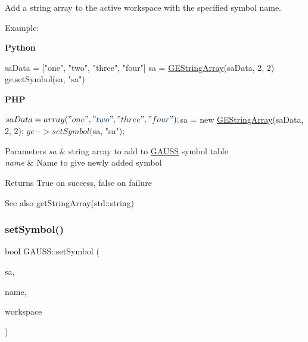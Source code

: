 Add a string array to the active workspace with the specified symbol name. 

Example\+:

{\bfseries Python} 
\begin{DoxyCode}
saData = [\textcolor{stringliteral}{"one"}, \textcolor{stringliteral}{"two"}, \textcolor{stringliteral}{"three"}, \textcolor{stringliteral}{"four"}]
sa = \hyperlink{class_g_e_string_array}{GEStringArray}(saData, 2, 2)
ge.setSymbol(sa, \textcolor{stringliteral}{"sa"})
\end{DoxyCode}


{\bfseries P\+HP} 
\begin{DoxyCode}
$saData = array(\textcolor{stringliteral}{"one"}, \textcolor{stringliteral}{"two"}, \textcolor{stringliteral}{"three"}, \textcolor{stringliteral}{"four"});
$sa = \textcolor{keyword}{new} \hyperlink{class_g_e_string_array}{GEStringArray}(saData, 2, 2);
$ge->setSymbol($sa, \textcolor{stringliteral}{"sa"});
\end{DoxyCode}



\begin{DoxyParams}{Parameters}
{\em sa} & string array to add to \hyperlink{class_g_a_u_s_s}{G\+A\+U\+SS} symbol table \\
\hline
{\em name} & Name to give newly added symbol \\
\hline
\end{DoxyParams}
\begin{DoxyReturn}{Returns}
True on success, false on failure
\end{DoxyReturn}
\begin{DoxySeeAlso}{See also}
get\+String\+Array(std\+::string) 
\end{DoxySeeAlso}
\mbox{\label{class_g_a_u_s_s_a608f4d41dbb4dd9fe839732bf5412043}} 
\subsubsection{\texorpdfstring{set\+Symbol()}{setSymbol()}\hspace{0.1cm}{\footnotesize\ttfamily [8/8]}}
{\footnotesize\ttfamily bool G\+A\+U\+S\+S\+::set\+Symbol (\begin{DoxyParamCaption}\item[{\hyperlink{class_g_e_string_array}{G\+E\+String\+Array} $\ast$}]{sa,  }\item[{std\+::string}]{name,  }\item[{\hyperlink{class_g_e_workspace}{G\+E\+Workspace} $\ast$}]{workspace }\end{DoxyParamCaption})}



